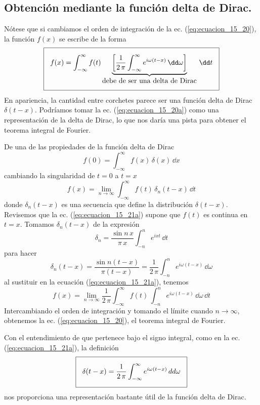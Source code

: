\subsection{Obtención mediante la función delta de Dirac.}
Nótese que si cambiamos el orden de integración de la ec. (\ref{eq:ecuacion_15_20}), la función $f(x)$ se escribe de la forma
\begin{align}
\setlength{\fboxsep}{3\fboxsep}\boxed{f(x)= \int_{-\infty}^{\infty} f(t) \underbrace{ \left[ \dfrac{1}{2 \, \pi} \int_{-\infty}^{\infty} e^{i \omega(t - x)} \, \dd \omega \right] }_{\mbox{debe de ser una delta de Dirac}} \, \dd t} 
\label{eq:ecuacion_15_20a}
\end{align}
En apariencia, la cantidad entre corchetes parece ser una función delta de Dirac $\delta (t - x)$. Podríamos tomar la ec. (\ref{eq:ecuacion_15_20a}) como una representación de la delta de Dirac, lo que nos daría una pista para obtener el teorema integral de Fourier.
\par
De una de las propiedades de la función delta de Dirac
\[ f(0) = \int_{-\infty}^{\infty} f(x) \, \delta(x) \, \dd x \]
cambiando la singularidad de $t = 0$ a $t = x$
\begin{equation}
f(x) = \lim_{n \to \infty} \int_{-\infty}^{\infty} f(t) \, \delta_{n} (t - x) \, \dd t
\label{eq:ecuacion_15_21a} 
\end{equation}
donde $\delta_{n}(t - x)$ es una secuencia que define la distribución $\delta(t - x)$. Revisemos que la ec. (\ref{eq:ecuacion_15_21a}) supone que $f(t)$ es continua en $t = x$. Tomamos $\delta_{n} (t - x)$  de la expresión
\[ \delta_{n} = \dfrac{\sin n \, x}{\pi \, x} \int_{-n}^{n} e^{i x t} \, \dd t \]
para hacer
\begin{equation}
\delta_{n} (t - x) = \dfrac{\sin n (t - x)}{\pi (t - x)} = \dfrac{1}{2 \, \pi} \int_{-n}^{n} e^{i \omega (t - x)} \, \dd \omega
\label{eq:ecuacion_15_21b}
\end{equation}
al sustituir en la ecuación (\ref{eq:ecuacion_15_21a}), tenemos
\begin{equation}
f(x) = \lim_{n \to \infty} \dfrac{1}{2 \, \pi} \int_{-\infty}^{\infty} f(t) \, \int_{-n}^{n} e^{i \omega (t - x)} \, \dd \omega \, \dd t
\label{eq:ecuacion_15_21c}
\end{equation}
Intercambiando el orden de integración y tomando el límite cuando $n \to \infty$, obtenemos la ec. (\ref{eq:ecuacion_15_20}), el teorema integral de Fourier.
\par
Con el entendimiento de que pertenece bajo el signo integral, como en la ec. (\ref{eq:ecuacion_15_21a}), la definición
\begin{equation}
\setlength{\fboxsep}{3\fboxsep}\boxed{\delta(t - x) = \dfrac{1}{2 \, \pi} \int_{-\infty}^{\infty} e^{i \omega (t - x)} \, dd \omega}
\label{eq:ecuacion_15_21d}
\end{equation}
nos proporciona una representación bastante útil de la función delta de Dirac.
